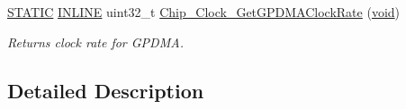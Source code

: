 \begin{DoxyCompactItemize}
\hyperlink{group__LPC__Types__Public__Macros_ga10b2d890d871e1489bb02b7e70d9bdfb}{S\-T\-A\-T\-I\-C} \hyperlink{group__LPC__Types__Public__Types_ga2eb6f9e0395b47b8d5e3eeae4fe0c116}{I\-N\-L\-I\-N\-E} uint32\-\_\-t \hyperlink{group__CLOCK__17XX__40XX_ga3141accbf546f4de8cfb005e31ec53a8}{Chip\-\_\-\-Clock\-\_\-\-Get\-G\-P\-D\-M\-A\-Clock\-Rate} (\hyperlink{Paradigm_2Tern__EE_2small_2portmacro_8h_a14d32f8130d3c0b212cfc751730b5b49}{void})
\begin{DoxyCompactList}\small\item\em Returns clock rate for G\-P\-D\-M\-A. \end{DoxyCompactList}\end{DoxyCompactItemize}


\subsection{Detailed Description}


